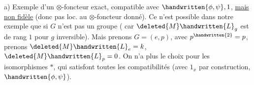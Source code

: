 a) Exemple d'un $\otimes$-foncteur exact, compatible avec $\handwritten{\phi,\psi},1$, \uline{mais non fidèle} (donc pas loc.  au $\otimes$-foncteur donné). Ce n'est possible dans notre exemple que si $G$ n'est pas un groupe ( car $\deleted{M}\handwritten{L}_g$ est de rang $1$ pour $g$ inversible). Mais prenons $G=(e,p)$, avec $p^{\handwritten{2}}=p$, prenons $\deleted{M}\handwritten{L}_e=k$, $\deleted{M}\handwritten{L}_p=0$. On n'a plus le choix pour les isomorphismes $*$, qui satisfont toutes les compatibilités (avec $1_x$ par construction, $\handwritten{\phi,\psi}$).
